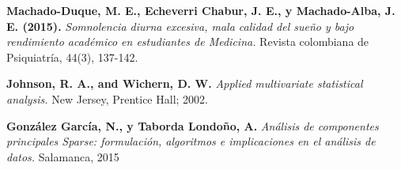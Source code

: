 \begin{thebibliography}{99}
 \textbf{Machado-Duque, M. E., Echeverri Chabur, J. E., y Machado-Alba, J. E. (2015).}\textit{ Somnolencia diurna excesiva, mala calidad del sueño y bajo rendimiento académico en estudiantes de Medicina.} Revista colombiana de Psiquiatría, 44(3), 137-142.

 \textbf{Johnson, R. A., and Wichern, D. W. } \emph{Applied multivariate statistical analysis.} New Jersey, Prentice Hall; 2002.

 \textbf{González García, N., y Taborda Londoño, A.} \emph{Análisis de componentes principales Sparse: formulación, algoritmos e implicaciones en el análisis de datos.} Salamanca,  2015

\end{thebibliography}
 